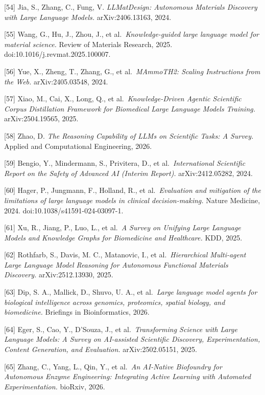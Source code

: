 {[}54{]} Jia, S., Zhang, C., Fung, V. \emph{LLMatDesign: Autonomous Materials Discovery with Large Language Models.} arXiv:2406.13163, 2024.

{[}55{]} Wang, G., Hu, J., Zhou, J., et al.~\emph{Knowledge-guided large language model for material science.} Review of Materials Research, 2025. doi:10.1016/j.revmat.2025.100007.

{[}56{]} Yue, X., Zheng, T., Zhang, G., et al.~\emph{MAmmoTH2: Scaling Instructions from the Web.} arXiv:2405.03548, 2024.

{[}57{]} Xiao, M., Cai, X., Long, Q., et al.~\emph{Knowledge-Driven Agentic Scientific Corpus Distillation Framework for Biomedical Large Language Models Training.} arXiv:2504.19565, 2025.

{[}58{]} Zhao, D. \emph{The Reasoning Capability of LLMs on Scientific Tasks: A Survey.} Applied and Computational Engineering, 2026.

{[}59{]} Bengio, Y., Mindermann, S., Privitera, D., et al.~\emph{International Scientific Report on the Safety of Advanced AI (Interim Report).} arXiv:2412.05282, 2024.

{[}60{]} Hager, P., Jungmann, F., Holland, R., et al.~\emph{Evaluation and mitigation of the limitations of large language models in clinical decision-making.} Nature Medicine, 2024. doi:10.1038/s41591-024-03097-1.

{[}61{]} Xu, R., Jiang, P., Luo, L., et al.~\emph{A Survey on Unifying Large Language Models and Knowledge Graphs for Biomedicine and Healthcare.} KDD, 2025.

{[}62{]} Rothfarb, S., Davis, M. C., Matanovic, I., et al.~\emph{Hierarchical Multi-agent Large Language Model Reasoning for Autonomous Functional Materials Discovery.} arXiv:2512.13930, 2025.

{[}63{]} Dip, S. A., Mallick, D., Shuvo, U. A., et al.~\emph{Large language model agents for biological intelligence across genomics, proteomics, spatial biology, and biomedicine.} Briefings in Bioinformatics, 2026.

{[}64{]} Eger, S., Cao, Y., D'Souza, J., et al.~\emph{Transforming Science with Large Language Models: A Survey on AI-assisted Scientific Discovery, Experimentation, Content Generation, and Evaluation.} arXiv:2502.05151, 2025.

{[}65{]} Zhang, C., Yang, L., Qin, Y., et al.~\emph{An AI-Native Biofoundry for Autonomous Enzyme Engineering: Integrating Active Learning with Automated Experimentation.} bioRxiv, 2026.

